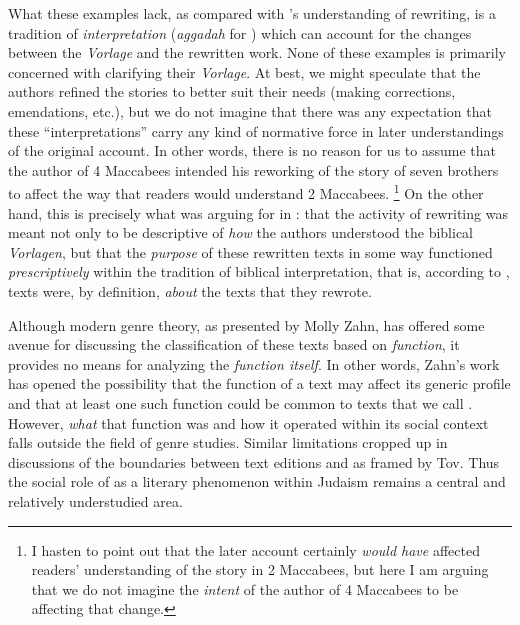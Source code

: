 What these examples lack, as compared with \vermes's understanding of rewriting, is a tradition of \emph{interpretation} (\emph{aggadah} for \vermes) which can account for the changes between the \emph{Vorlage} and the rewritten work. None of these examples is primarily concerned with clarifying their \emph{Vorlage}. At best, we might speculate that the authors refined the stories to better suit their needs (making corrections, emendations, etc.), but we do not imagine that there was any expectation that these ``interpretations'' carry any kind of normative force in later understandings of the original account. In other words, there is no reason for us to assume that the author of 4 Maccabees intended his reworking of the story of seven brothers to affect the way that readers would understand 2 Maccabees.%
    \footnote{I hasten to point out that the later account certainly \emph{would have} affected readers' understanding of the story in 2 Maccabees, but here I am arguing that we do not imagine the \emph{intent} of the author of 4 Maccabees to be affecting that change.}
On the other hand, this is precisely what \vermes was arguing for in : that the activity of rewriting was meant not only to be descriptive of \emph{how} the authors understood the biblical \emph{Vorlagen}, but that the \emph{purpose} of these rewritten texts in some way functioned \emph{prescriptively} within the tradition of biblical interpretation, that is, according to \vermes, \rwb texts were, by definition, \emph{about} the texts that they rewrote. 

Although modern genre theory, as presented by Molly Zahn, has offered some avenue for discussing the classification of these texts based on \emph{function}, it provides no means for analyzing the \emph{function itself}. In other words, Zahn's work has opened the possibility that the function of a text may affect its generic profile and that at least one such function could be common to texts that we call \rwb. However, \emph{what} that function was and how it operated within its social context falls outside the field of genre studies. Similar limitations cropped up in discussions of the boundaries between text editions and \rwb as framed by Tov. Thus the social role of \rwb as a literary phenomenon within \secondtemple Judaism remains a central and relatively understudied area.

